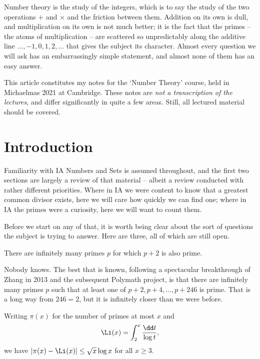 



Number theory is the study of the integers, which is to say the study of the two operations $+$ and $\times$ and the friction between them. Addition on its own is dull, and multiplication on its own is not much better; it is the fact that the primes -- the atoms of multiplication -- are scattered so unpredictably along the additive line $\dots, -1, 0, 1, 2, \dots$ that gives the subject its character. Almost every question we will ask has an embarrassingly simple statement, and almost none of them has an easy answer.

This article constitutes my notes for the `Number Theory' course, held in Michaelmas 2021 at Cambridge. These notes are \emph{not a transcription of the lectures}, and differ significantly in quite a few areas. Still, all lectured material should be covered.



\section{Introduction}

Familiarity with IA Numbers and Sets is assumed throughout, and the first two sections are largely a review of that material -- albeit a review conducted with rather different priorities. Where in IA we were content to know that a greatest common divisor exists, here we will care how quickly we can find one; where in IA the primes were a curiosity, here we will want to count them.

Before we start on any of that, it is worth being clear about the sort of questions the subject is trying to answer. Here are three, all of which are still open.

\begin{conjecture}
	There are infinitely many primes $p$ for which $p + 2$ is also prime.
\end{conjecture}

Nobody knows. The best that is known, following a spectacular breakthrough of Zhang in 2013 and the subsequent Polymath project, is that there are infinitely many primes $p$ such that at least one of $p+2, p+4, \dots, p+246$ is prime. That is a long way from $246 = 2$, but it is infinitely closer than we were before.

\begin{conjecture}
	Writing $\pi(x)$ for the number of primes at most $x$ and
	$$
	\Li(x) = \int_2^x \frac{\dd t}{\log t},
	$$
	we have $|\pi(x) - \Li(x)| \leq \sqrt{x} \log x$ for all $x \geq 3$.
\end{conjecture}

